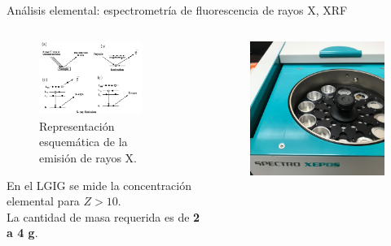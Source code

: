 \documentclass[9pt]{beamer}
\begin{document}
\begin{frame}{Análisis elemental: espectrometría de fluorescencia de rayos X, XRF}
	\begin{columns}
		\begin{column}{0.58\textwidth}
			\begin{figure}
			\includegraphics[width=0.8\textwidth]{Imagenes/XRF-Book.png}
			\caption{Representación esquemática de la emisión de rayos X\footnotemark[1].}
			\end{figure}
			\justifying En el LGIG se mide la concentración elemental para $Z>10$. 
			\\
			\vspace{0.5cm}
			La cantidad de masa requerida es de \textbf{2 a 4 g}.
		\end{column}
		\begin{column}{0.38\textwidth}  
			\begin{figure}
			\centering
			\includegraphics[width=1\textwidth]{Imagenes/XEPOS.jpg}

\end{figure}
\end{column}
\end{columns}
\end{frame}
\end{document}
